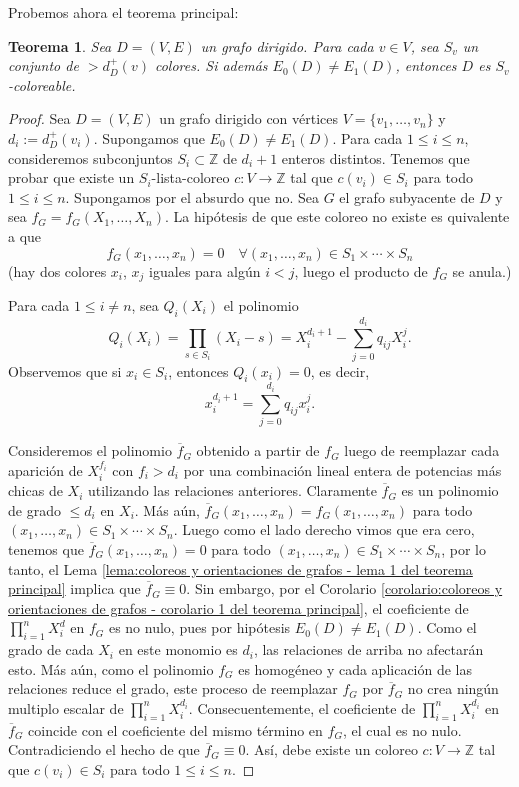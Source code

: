 \documentclass[12pt]{report}
\theoremstyle{plain}
\newtheorem{theorem}{Teorema}[section]
\theoremstyle{definition}
\newcommand{\integers}{\mathbb{Z}}
\renewcommand{\bar}[1]{\overline{#1}}
\begin{document}
Probemos ahora el teorema principal:


\begin{theorem}\label{th: todo grafo dirigido sin mismo numero de paseos eulerianos pares a impares es d+1 lista coloreable donde d es el maximo de todos los grados exteriores}
Sea $D = (V,E)$ un grafo dirigido. Para cada $v \in V$, sea $S_v$ un conjunto de $>d^+_D (v)$ colores. Si además $E_0 (D) \neq E_1 (D)$, entonces $D$ es $S_v$-coloreable.
\end{theorem}
\begin{proof}
Sea $D= (V,E)$ un grafo dirigido con vértices $V = \{v_1, \ldots, v_n\}$ y $d_i := d_D^+ (v_i)$. Supongamos que $E_0 (D) \neq E_1 (D)$. Para cada $1 \leq i \leq n$, consideremos subconjuntos $S_i \subset \integers$ de $d_i + 1$ enteros distintos. Tenemos que probar que existe un $S_i$-lista-coloreo $c : V \rightarrow \integers$ tal que $c(v_i) \in S_i$ para todo $1\leq i \leq n$. Supongamos por el absurdo que no. Sea $G$ el grafo subyacente de $D$ y sea $f_G = f_G (X_1, \ldots, X_n)$. La hipótesis de que este coloreo no existe es quivalente a que
\[
    f_G (x_1, \ldots, x_n) = 0 \quad \forall (x_1, \ldots, x_n) \in S_1 \times \cdots \times S_n
\]
(hay dos colores $x_i$, $x_j$ iguales para algún $i < j$, luego el producto de $f_G$ se anula.)

Para cada $1 \leq i \neq n$, sea $Q_i (X_i)$ el polinomio
\[
    Q_i (X_i) = \prod_{s \in S_i} (X_i - s) = X_i^{d_i + 1} - \sum_{j = 0}^{d_i} q_{ij} X_i^j.
\]
Observemos que si $x_i \in S_i$, entonces $Q_i (x_i) = 0$, es decir,
\[
    x_i^{d_i + 1} = \sum_{j = 0}^{d_i} q_{ij} x_i^j.
\]

Consideremos el polinomio $\bar f_G$ obtenido a partir de $f_G$ luego de reemplazar cada aparición de $X_i^{f_i}$ con $f_i > d_i$ por una combinación lineal entera de potencias más chicas de $X_i$ utilizando las relaciones anteriores. Claramente $\bar f_G$ es un polinomio de grado $\leq d_i$ en $X_i$. Más aún, $\bar f _G (x_1, \ldots, x_n) = f_G (x_1, \ldots, x_n)$ para todo $(x_1, \ldots, x_n) \in S_1 \times \cdots \times S_n$. Luego como el lado derecho vimos que era cero, tenemos que $\bar f _G (x_1, \ldots, x_n) = 0$ para todo $(x_1, \ldots, x_n) \in S_1 \times \cdots \times S_n$, por lo tanto, el Lema \ref{lema:coloreos y orientaciones de grafos - lema 1 del teorema principal} implica que $\bar f _G \equiv 0$. Sin embargo, por el Corolario \ref{corolario:coloreos y orientaciones de grafos - corolario 1 del teorema principal}, el coeficiente de $\prod_{i = 1}^n X_i^d$ en $f_G$ es no nulo, pues por hipótesis $E_0 (D) \neq E_1 (D)$. Como el grado de cada $X_i$ en este monomio es $d_i$, las relaciones de arriba no afectarán esto. Más aún, como el polinomio $f_G$ es homogéneo y cada aplicación de las relaciones reduce el grado, este proceso de reemplazar $f_G$ por $\bar f_G$ no crea ningún multiplo escalar de $\prod_{i = 1}^n X_i^{d_i}$. Consecuentemente, el coeficiente de $\prod_{i = 1}^n X_i^{d_i}$ en $\bar f _G$ coincide con el coeficiente del mismo término en $f_G$, el cual es no nulo. Contradiciendo el hecho de que $\bar f _G \equiv 0$. Así, debe existe un coloreo $c : V \rightarrow \integers$ tal que $c(v_i) \in S_i$ para todo $1 \leq i \leq n$.


\end{proof}
\end{document}
